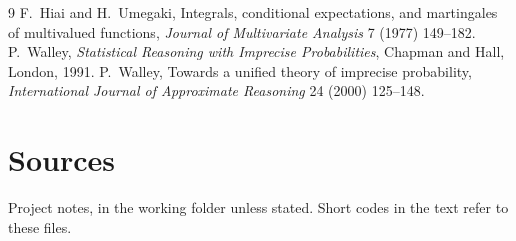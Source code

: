 \documentclass[11pt]{article}
\theoremstyle{definition}
\theoremstyle{remark}
\begin{document}
\begin{thebibliography}{9}
 F.~Hiai and H.~Umegaki, Integrals, conditional expectations, and martingales of multivalued functions, \emph{Journal of Multivariate Analysis} 7 (1977) 149--182.
 P.~Walley, \emph{Statistical Reasoning with Imprecise Probabilities}, Chapman and Hall, London, 1991.
 P.~Walley, Towards a unified theory of imprecise probability, \emph{International Journal of Approximate Reasoning} 24 (2000) 125--148.
\end{thebibliography}

\section*{Sources}\label{sec:sources}
Project notes, in the working folder unless stated. Short codes in the text refer to these files.
\end{document}
